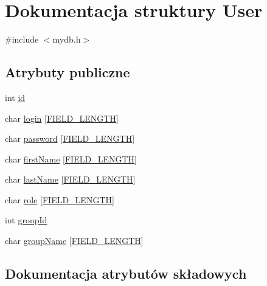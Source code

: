\hypertarget{structUser}{}\section{Dokumentacja struktury User}
\label{structUser}


{\ttfamily \#include $<$mydb.\+h$>$}

\subsection*{Atrybuty publiczne}
\begin{DoxyCompactItemize}
\item 
int \mbox{\hyperlink{structUser_aa7e6e39b43020bbe9c3a196b3689b0f7}{id}}
\item 
char \mbox{\hyperlink{structUser_a8771105ae412adbc4b211ea70d5a765a}{login}} \mbox{[}\mbox{\hyperlink{mydb_8h_a4e8ecaf2d59499a8c159ccdf7be1baec}{F\+I\+E\+L\+D\+\_\+\+L\+E\+N\+G\+TH}}\mbox{]}
\item 
char \mbox{\hyperlink{structUser_a2e1494fae9c80908a5169c253321b08f}{password}} \mbox{[}\mbox{\hyperlink{mydb_8h_a4e8ecaf2d59499a8c159ccdf7be1baec}{F\+I\+E\+L\+D\+\_\+\+L\+E\+N\+G\+TH}}\mbox{]}
\item 
char \mbox{\hyperlink{structUser_ae59a5e51a7153b783721a547b8123955}{first\+Name}} \mbox{[}\mbox{\hyperlink{mydb_8h_a4e8ecaf2d59499a8c159ccdf7be1baec}{F\+I\+E\+L\+D\+\_\+\+L\+E\+N\+G\+TH}}\mbox{]}
\item 
char \mbox{\hyperlink{structUser_a4b36f115eb1b13a6d0d6075548d773e5}{last\+Name}} \mbox{[}\mbox{\hyperlink{mydb_8h_a4e8ecaf2d59499a8c159ccdf7be1baec}{F\+I\+E\+L\+D\+\_\+\+L\+E\+N\+G\+TH}}\mbox{]}
\item 
char \mbox{\hyperlink{structUser_a1e6d9b3124f7a86d09aaecbd7a61e33b}{role}} \mbox{[}\mbox{\hyperlink{mydb_8h_a4e8ecaf2d59499a8c159ccdf7be1baec}{F\+I\+E\+L\+D\+\_\+\+L\+E\+N\+G\+TH}}\mbox{]}
\item 
int \mbox{\hyperlink{structUser_a0705d63129ed97d6215449972bdd4093}{group\+Id}}
\item 
char \mbox{\hyperlink{structUser_a12c064564ff31a9c7610f1e7322e5fc4}{group\+Name}} \mbox{[}\mbox{\hyperlink{mydb_8h_a4e8ecaf2d59499a8c159ccdf7be1baec}{F\+I\+E\+L\+D\+\_\+\+L\+E\+N\+G\+TH}}\mbox{]}
\end{DoxyCompactItemize}


\subsection{Dokumentacja atrybutów składowych}
\mbox{\label{structUser_ae59a5e51a7153b783721a547b8123955}} 
